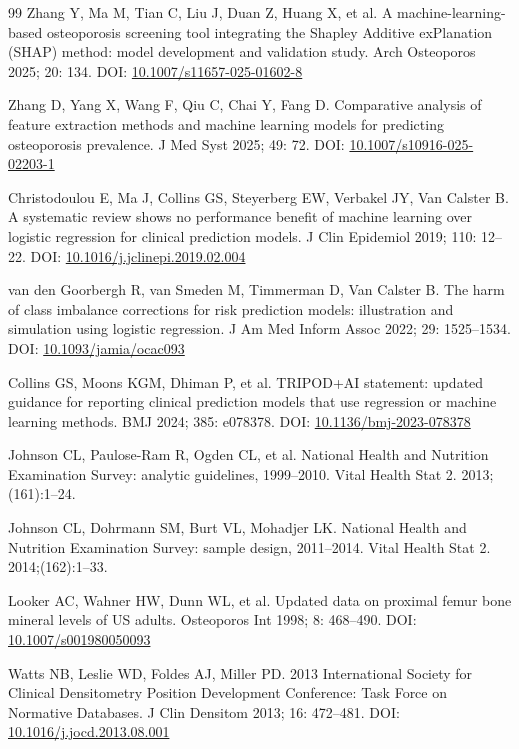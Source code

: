 \documentclass[11pt,a4paper]{article}
\begin{document}
\begin{thebibliography}{99}
 Zhang Y, Ma M, Tian C, Liu J, Duan Z, Huang X, et al. A machine-learning-based osteoporosis screening tool integrating the Shapley Additive exPlanation (SHAP) method: model development and validation study. Arch Osteoporos 2025; 20: 134. DOI: \href{https://doi.org/10.1007/s11657-025-01602-8}{10.1007/s11657-025-01602-8}

 Zhang D, Yang X, Wang F, Qiu C, Chai Y, Fang D. Comparative analysis of feature extraction methods and machine learning models for predicting osteoporosis prevalence. J Med Syst 2025; 49: 72. DOI: \href{https://doi.org/10.1007/s10916-025-02203-1}{10.1007/s10916-025-02203-1}

 Christodoulou E, Ma J, Collins GS, Steyerberg EW, Verbakel JY, Van Calster B. A systematic review shows no performance benefit of machine learning over logistic regression for clinical prediction models. J Clin Epidemiol 2019; 110: 12--22. DOI: \href{https://doi.org/10.1016/j.jclinepi.2019.02.004}{10.1016/j.jclinepi.2019.02.004}

 van den Goorbergh R, van Smeden M, Timmerman D, Van Calster B. The harm of class imbalance corrections for risk prediction models: illustration and simulation using logistic regression. J Am Med Inform Assoc 2022; 29: 1525--1534. DOI: \href{https://doi.org/10.1093/jamia/ocac093}{10.1093/jamia/ocac093}

 Collins GS, Moons KGM, Dhiman P, et al. TRIPOD+AI statement: updated guidance for reporting clinical prediction models that use regression or machine learning methods. BMJ 2024; 385: e078378. DOI: \href{https://doi.org/10.1136/bmj-2023-078378}{10.1136/bmj-2023-078378}

 Johnson CL, Paulose-Ram R, Ogden CL, et al. National Health and Nutrition Examination Survey: analytic guidelines, 1999--2010. Vital Health Stat 2. 2013;(161):1--24.

 Johnson CL, Dohrmann SM, Burt VL, Mohadjer LK. National Health and Nutrition Examination Survey: sample design, 2011--2014. Vital Health Stat 2. 2014;(162):1--33.

 Looker AC, Wahner HW, Dunn WL, et al. Updated data on proximal femur bone mineral levels of US adults. Osteoporos Int 1998; 8: 468--490. DOI: \href{https://doi.org/10.1007/s001980050093}{10.1007/s001980050093}

 Watts NB, Leslie WD, Foldes AJ, Miller PD. 2013 International Society for Clinical Densitometry Position Development Conference: Task Force on Normative Databases. J Clin Densitom 2013; 16: 472--481. DOI: \href{https://doi.org/10.1016/j.jocd.2013.08.001}{10.1016/j.jocd.2013.08.001}


\end{thebibliography}
\end{document}

